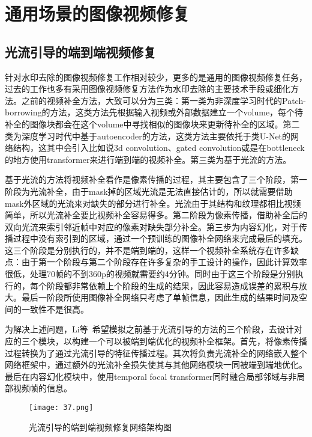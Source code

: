 \section{通用场景的图像视频修复}
\label{sec:other}

\subsection{光流引导的端到端视频修复}

针对水印去除的图像视频修复工作相对较少，更多的是通用的图像视频修复任务，过去的工作也多有采用图像视频修复方法作为水印去除的主要技术手段或细化方法。之前的视频补全方法，大致可以分为三类：第一类为非深度学习时代的Patch-borrowing的方法，这类方法先根据输入视频或外部数据建立一个volume，每个待补全的图像块都会在这个volume中寻找相似的图像块来更新待补全的区域。第二类为深度学习时代中基于autoencoder的方法，这类方法主要依托于类U-Net的网络结构，这其中会引入比如说3d convolution、gated convolution或是在bottleneck的地方使用transformer来进行端到端的视频补全。第三类为基于光流的方法。

基于光流的方法将视频补全看作是像素传播的过程，其主要包含了三个阶段，第一阶段为光流补全，由于mask掉的区域光流是无法直接估计的，所以就需要借助mask外区域的光流来对缺失的部分进行补全。光流由于其结构和纹理都相比视频简单，所以光流补全要比视频补全容易得多。第二阶段为像素传播，借助补全后的双向光流来索引邻近帧中对应的像素对缺失部分补全。第三步为内容幻化，对于传播过程中没有索引到的区域，通过一个预训练的图像补全网络来完成最后的填充。这三个阶段是分别执行的，并不是端到端的，这样一个视频补全系统存在许多缺点：由于第一个阶段与第二个阶段存在许多复杂的手工设计的操作，因此计算效率很低，处理70帧的不到360p的视频就需要约4分钟。同时由于这三个阶段是分别执行的，每个阶段都非常依赖上个阶段的生成的结果，因此容易造成误差的累积与放大。最后一阶段所使用图像补全网络只考虑了单帧信息，因此生成的结果时间及空间的一致性不是很高。

为解决上述问题，Li等~\cite{li2022towards}希望模拟之前基于光流引导的方法的三个阶段，去设计对应的三个模块，以构建一个可以被端到端优化的视频补全框架。首先，将像素传播过程转换为了通过光流引导的特征传播过程。其次将负责光流补全的网络嵌入整个网络框架中，通过额外的光流补全损失使其与其他网络模块一同被端到端地优化。最后在内容幻化模块中，使用temporal focal transformer同时融合局部邻域与非局部视频帧的信息。

\begin{figure*}[!htbp]
	\centering
	\texttt{[image: 37.png]}
	\caption{光流引导的端到端视频修复网络架构图}
	\label{fig:37}
\end{figure*}

